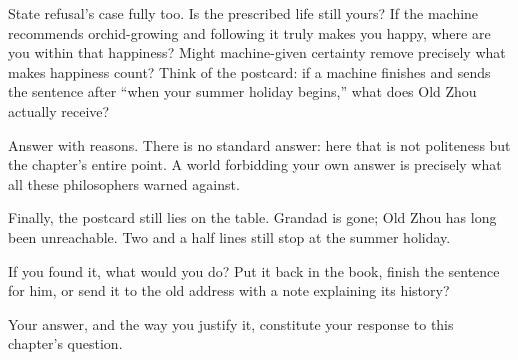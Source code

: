 State refusal's case fully too. Is the prescribed life still yours? If the machine recommends orchid-growing and following it truly makes you happy, where are you within that happiness? Might machine-given certainty remove precisely what makes happiness count? Think of the postcard: if a machine finishes and sends the sentence after ``when your summer holiday begins,'' what does Old Zhou actually receive?

Answer with reasons. There is no standard answer: here that is not politeness but the chapter's entire point. A world forbidding your own answer is precisely what all these philosophers warned against.

Finally, the postcard still lies on the table. Grandad is gone; Old Zhou has long been unreachable. Two and a half lines still stop at the summer holiday.

If you found it, what would you do? Put it back in the book, finish the sentence for him, or send it to the old address with a note explaining its history?

Your answer, and the way you justify it, constitute your response to this chapter's question.
